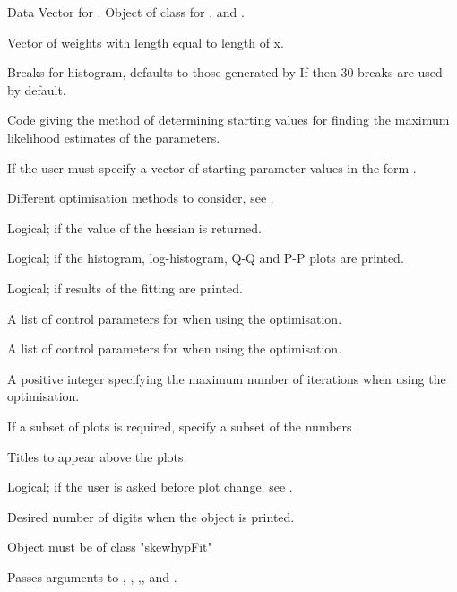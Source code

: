 \documentclass{book}
\begin{document}
\begin{Arguments}
\begin{ldescription}
\item[\code{x}] Data Vector for . Object of class
 for ,
 and .
\item[\code{freq}] Vector of weights with length equal to length of x.
\item[\code{breaks}] Breaks for histogram, defaults to those generated by
If 
then 30 breaks are used by default.
\item[\code{startValues}] Code giving the method of determining starting
values for finding the maximum likelihood estimates of the
parameters.
\item[\code{paramStart}] If  the user must specify a
vector of starting parameter values in the form .
\item[\code{method}] Different optimisation methods to consider, see
.
\item[\code{hessian}] Logical; if  the value of the
hessian is returned.
\item[\code{plots}] Logical; if  the histogram,
log-histogram, Q-Q and P-P plots are printed.
\item[\code{printOut}] Logical; if  results of the
fitting are printed.
\item[\code{controlBFGS}] A list of control parameters for  when
using the  optimisation.
\item[\code{controlNM}] A list of control parameters for 
when using the  optimisation.
\item[\code{maxitNLM}] A positive integer specifying the maximum number of
iterations when using the  optimisation.
\item[\code{which}] If a subset of plots is required, specify a subset of the
numbers .
\item[\code{plotTitles}] Titles to appear above the plots.
\item[\code{ask}] Logical; if  the user is asked before plot
change, see .
\item[\code{digits}] Desired number of digits when the object is printed.
\item[\code{object}] Object must be of class "skewhypFit"
\item[\code{...}] Passes arguments to , ,
,,
 and .
\end{ldescription}
\end{Arguments}
\end{document}
